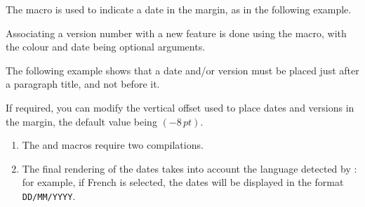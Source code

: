 

\begin{tdocexa}
    The  macro is used to indicate a date in the margin, as in the following example.


\end{tdocexa}




\begin{tdocexa}
    Associating a version number with a new feature is done using the  macro, with the colour and date being optional arguments.


\end{tdocexa}


\begin{tdocexa}
	The following example shows that a date and/or version must be placed just after a paragraph title, and not before it.


\end{tdocexa}


\begin{tdocexa}
	If required, you can modify the vertical offset used to place dates and versions in the margin, the default value being $(-8\,\mathit{pt})$.


\end{tdocexa}


\begin{tdocimp}
    \begin{enumerate}[wide]
        \item The  and  macros require two compilations.

        \item The final rendering of the dates takes into account the language detected by \thisproj{}: for example, if French is selected, the dates will be displayed in the format \texttt{DD/MM/YYYY}.
    \end{enumerate}
\end{tdocimp}



